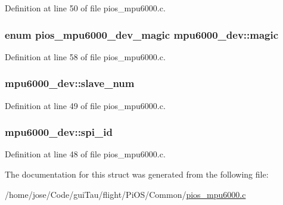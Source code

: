Definition at line 50 of file pios\-\_\-mpu6000.\-c.

\hypertarget{structmpu6000__dev_a11582fec1335a7b8e45979545ce7191b}{
\subsubsection[{magic}]{\setlength{\rightskip}{0pt plus 5cm}enum {\bf pios\-\_\-mpu6000\-\_\-dev\-\_\-magic} mpu6000\-\_\-dev\-::magic}}\label{structmpu6000__dev_a11582fec1335a7b8e45979545ce7191b}


Definition at line 58 of file pios\-\_\-mpu6000.\-c.

\hypertarget{structmpu6000__dev_a2b1869dd86c392ccfe9a0cd881a3b4a7}{
\subsubsection[{slave\-\_\-num}]{ mpu6000\-\_\-dev\-::slave\-\_\-num}}\label{structmpu6000__dev_a2b1869dd86c392ccfe9a0cd881a3b4a7}


Definition at line 49 of file pios\-\_\-mpu6000.\-c.

\hypertarget{structmpu6000__dev_a7409608d24410d4ef980f9c05085bdb5}{
\subsubsection[{spi\-\_\-id}]{ mpu6000\-\_\-dev\-::spi\-\_\-id}}\label{structmpu6000__dev_a7409608d24410d4ef980f9c05085bdb5}


Definition at line 48 of file pios\-\_\-mpu6000.\-c.



The documentation for this struct was generated from the following file\-:\begin{DoxyCompactItemize}
\item 
/home/jose/\-Code/gui\-Tau/flight/\-Pi\-O\-S/\-Common/\hyperlink{pios__mpu6000_8c}{pios\-\_\-mpu6000.\-c}\end{DoxyCompactItemize}
